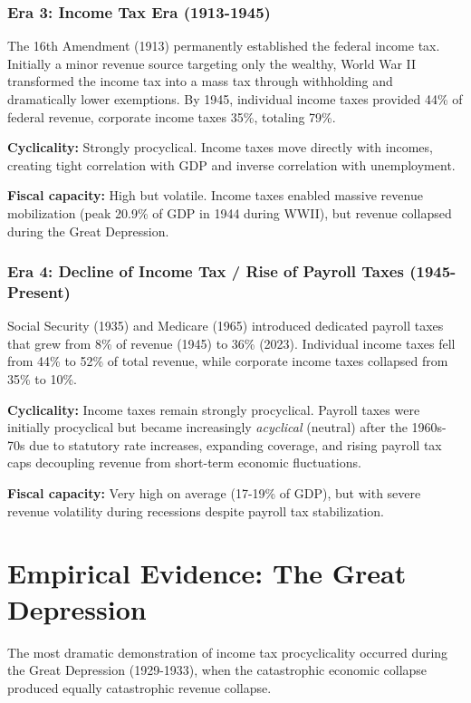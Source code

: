 \documentclass[12pt,letterpaper]{article}
\begin{document}
\subsubsection{Era 3: Income Tax Era (1913-1945)}

The 16th Amendment (1913) permanently established the federal income tax. Initially a minor revenue source targeting only the wealthy, World War II transformed the income tax into a mass tax through withholding and dramatically lower exemptions. By 1945, individual income taxes provided 44\% of federal revenue, corporate income taxes 35\%, totaling 79\%.

\textbf{Cyclicality:} Strongly procyclical. Income taxes move directly with incomes, creating tight correlation with GDP and inverse correlation with unemployment.

\textbf{Fiscal capacity:} High but volatile. Income taxes enabled massive revenue mobilization (peak 20.9\% of GDP in 1944 during WWII), but revenue collapsed during the Great Depression.

\subsubsection{Era 4: Decline of Income Tax / Rise of Payroll Taxes (1945-Present)}

Social Security (1935) and Medicare (1965) introduced dedicated payroll taxes that grew from 8\% of revenue (1945) to 36\% (2023). Individual income taxes fell from 44\% to 52\% of total revenue, while corporate income taxes collapsed from 35\% to 10\%.

\textbf{Cyclicality:} Income taxes remain strongly procyclical. Payroll taxes were initially procyclical but became increasingly \textit{acyclical} (neutral) after the 1960s-70s due to statutory rate increases, expanding coverage, and rising payroll tax caps decoupling revenue from short-term economic fluctuations.

\textbf{Fiscal capacity:} Very high on average (17-19\% of GDP), but with severe revenue volatility during recessions despite payroll tax stabilization.

\newpage

\section{Empirical Evidence: The Great Depression}

The most dramatic demonstration of income tax procyclicality occurred during the Great Depression (1929-1933), when the catastrophic economic collapse produced equally catastrophic revenue collapse.
\end{document}
